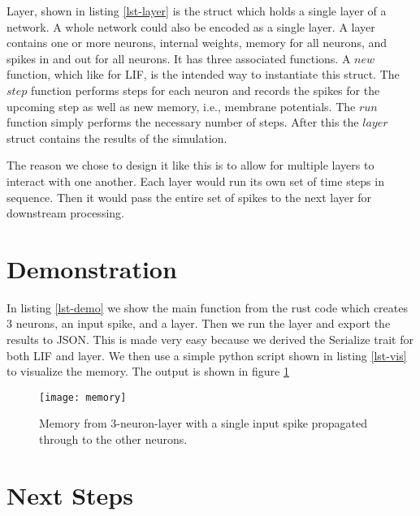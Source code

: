 \documentclass[12pt,english]{article}
\begin{document}

Layer, shown in listing \ref{lst-layer} is the struct which holds a single layer of a network.
A whole network could also be encoded as a single layer. 
A layer contains one or more neurons, internal weights, memory for all neurons, and spikes in and out for all neurons.
It has three associated functions.
A $new$ function, which like for LIF, is the intended way to instantiate this struct.
The $step$ function performs steps for each neuron and records the spikes for the upcoming step as well as new memory, i.e., membrane potentials.
The $run$ function simply performs the necessary number of steps.
After this the $layer$ struct contains the results of the simulation.

The reason we chose to design it like this is to allow for multiple layers to interact with one another.
Each layer would run its own set of time steps in sequence.
Then it would pass the entire set of spikes to the next layer for downstream processing.


\section{Demonstration}

In listing \ref{lst-demo} we show the main function from the rust code which creates 3 neurons, an input spike, and a layer.
Then we run the layer and export the results to JSON.
This is made very easy because we derived the Serialize trait for both LIF and layer.
We then use a simple python script shown in listing \ref{lst-vis} to visualize the memory.
The output is shown in figure \ref{fig-mem}



\begin{figure}[h]
    \centering
    \texttt{[image: memory]}
    \caption{Memory from 3-neuron-layer with a single input spike propagated through to the other neurons.}
    \label{fig-mem}
\end{figure}

\section{Next Steps}
\end{document}
